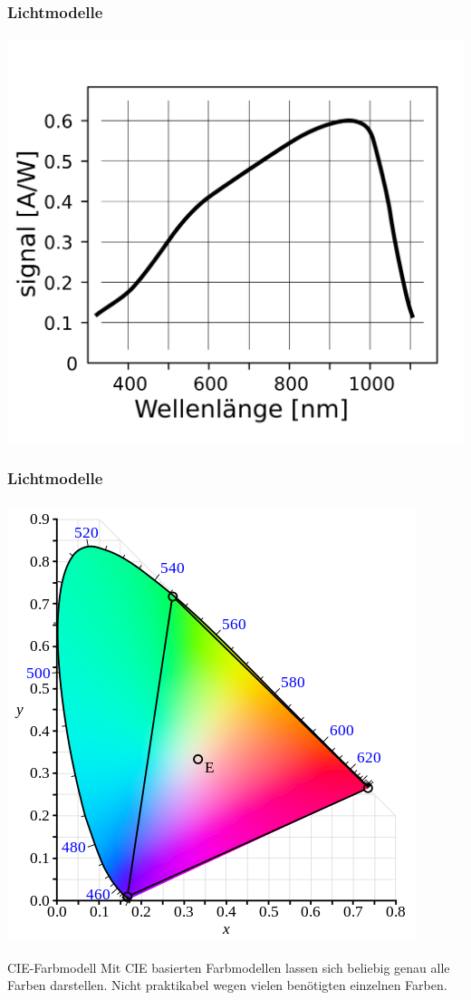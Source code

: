 \documentclass{beamer}
\begin{document}
\begin{frame}
    \frametitle{Lichtmodelle}
\framesubtitle{}
\begin{center}
\includegraphics[scale=0.1]{images/photodiode_strom}
\end{center}

\end{frame}




\begin{frame}
    \frametitle{Lichtmodelle}
\framesubtitle{}
\begin{center}
\includegraphics[scale=0.3]{images/cie}
\end{center}
    \begin{block}{CIE-Farbmodell}
Mit CIE basierten Farbmodellen lassen sich beliebig genau alle Farben darstellen. Nicht praktikabel wegen vielen benötigten einzelnen Farben.
\end{block}
\end{frame}
\end{document}
